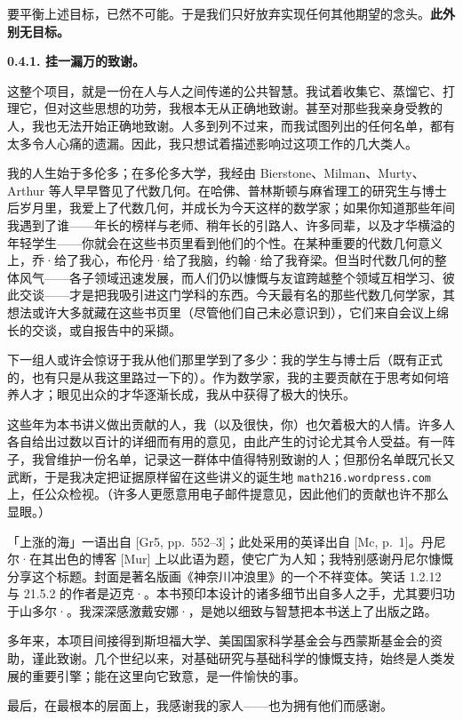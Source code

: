 要平衡上述目标，已然不可能。于是我们只好放弃实现任何其他期望的念头。\textbf{此外别无目标。}

\noindent\textbf{0.4.1. 挂一漏万的致谢。}

这整个项目，就是一份在人与人之间传递的公共智慧。我试着收集它、蒸馏它、打理它，但对这些思想的功劳，我根本无从正确地致谢。甚至对那些我亲身受教的人，我也无法开始正确地致谢。人多到列不过来，而我试图列出的任何名单，都有太多令人心痛的遗漏。因此，我只想试着描述影响过这项工作的几大类人。

我的人生始于多伦多；在多伦多大学，我经由 Bierstone、Milman、Murty、Arthur 等人早早瞥见了代数几何。在哈佛、普林斯顿与麻省理工的研究生与博士后岁月里，我爱上了代数几何，并成长为今天这样的数学家；如果你知道那些年间我遇到了谁——年长的榜样与老师、稍年长的引路人、许多同辈，以及才华横溢的年轻学生——你就会在这些书页里看到他们的个性。在某种重要的代数几何意义上，乔·\trHarris{}给了我心，布伦丹·\trHassett{}给了我脑，约翰·\trDeJong{}给了我脊梁。但当时代数几何的整体风气——各子领域迅速发展，而人们仍以慷慨与友谊跨越整个领域互相学习、彼此交谈——才是把我吸引进这门学科的东西。今天最有名的那些代数几何学家，其想法或许大多就藏在这些书页里（尽管他们自己未必意识到），它们来自会议上绵长的交谈，或自报告中的采撷。

下一组人或许会惊讶于我从他们那里学到了多少：我的学生与博士后（既有正式的，也有只是从我这里路过一下的）。作为数学家，我的主要贡献在于思考如何培养人才；眼见出众的才华逐渐长成，我从中获得了极大的快乐。

这些年为本书讲义做出贡献的人，我（以及很快，你）也欠着极大的人情。许多人各自给出过数以百计的详细而有用的意见，由此产生的讨论尤其令人受益。有一阵子，我曾维护一份名单，记录这一群体中值得特别致谢的人；但那份名单既冗长又武断，于是我决定把证据原样留在这些讲义的诞生地 \texttt{math216.wordpress.com} 上，任公众检视。（许多人更愿意用电子邮件提意见，因此他们的贡献也许不那么显眼。）

「上涨的海」一语出自\trGrothendieck{} [Gr5, pp.~552--3]；此处采用的英译出自\trMcLarty{} [Mc, p.~1]。丹尼尔·\trMurfet{}在其出色的博客 [Mur] 上以此语为题，使它广为人知；我特别感谢丹尼尔慷慨分享这个标题。封面是\trHokusai{}著名版画《神奈川冲浪里》的一个不祥变体。笑话 1.2.12 与 21.5.2 的作者是迈克·\trStay。本书预印本设计的诸多细节出自多人之手，尤其要归功于山多尔·\trKovacs。我深深感激戴安娜·\trGillooly{}，是她以细致与智慧把本书送上了出版之路。

多年来，本项目间接得到斯坦福大学、美国国家科学基金会与西蒙斯基金会的资助，谨此致谢。几个世纪以来，对基础研究与基础科学的慷慨支持，始终是人类发展的重要引擎；能在这里向它致意，是一件愉快的事。

最后，在最根本的层面上，我感谢我的家人——也为拥有他们而感谢。
